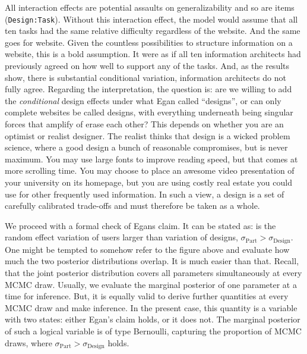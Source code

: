 \documentclass[]{svmono}
\theoremstyle{definition}
\theoremstyle{definition}
\theoremstyle{definition}
\theoremstyle{remark}
\begin{document}
All interaction effects are potential assaults on generalizability and
so are items (\texttt{Design:Task}). Without this interaction effect,
the model would assume that all ten tasks had the same relative
difficulty regardless of the website. And the same goes for website.
Given the countless possibilities to structure information on a website,
this is a bold assumption. It were as if all ten information architects
had previously agreed on how well to support any of the tasks. And, as
the results show, there is substantial conditional variation,
information architects do not fully agree. Regarding the interpretation,
the question is: are we willing to add the \emph{conditional} design
effects under what Egan called ``designs'', or can only complete
websites be called designs, with everything underneath being singular
forces that amplify of erase each other? This depends on whether you are
an optimist or realist designer. The realist thinks that design is a
wicked problem science, where a good design a bunch of reasonable
compromises, but is never maximum. You may use large fonts to improve
reading speed, but that comes at more scrolling time. You may choose to
place an awesome video presentation of your university on its homepage,
but you are using costly real estate you could use for other frequently
used information. In such a view, a design is a set of carefully
calibrated trade-offs and must therefore be taken as a whole.

We proceed with a formal check of Egans claim. It can be stated as: is
the random effect variation of users larger than variation of designs,
\(\sigma_ \textrm{Part} > \sigma_ \textrm{Design}\). One might be
tempted to somehow refer to the figure above and evaluate how much the
two posterior distributions overlap. It is much easier than that.
Recall, that the joint posterior distribution covers all parameters
simultaneously at every MCMC draw. Usually, we evaluate the marginal
posterior of one parameter at a time for inference. But, it is equally
valid to derive further quantities at every MCMC draw and make
inference. In the present case, this quantity is a variable with two
states: either Egan's claim holds, or it does not. The marginal
posterior of such a logical variable is of type Bernoulli, capturing the
proportion of MCMC draws, where
\(\sigma_ \textrm{Part} > \sigma_ \textrm{Design}\) holds.
\end{document}
